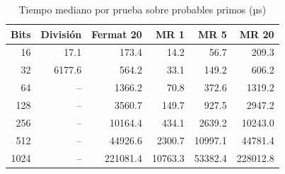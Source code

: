 \begin{table}[H]\centering\small
\caption{Tiempo mediano por prueba sobre probables primos (µs)}
\label{tab:tiempos}
\begin{tabular}{rrrrrr}\toprule
Bits & División & Fermat 20 & MR 1 & MR 5 & MR 20 \\
\midrule
16 & 17.1 & 173.4 & 14.2 & 56.7 & 209.3 \\ 
32 & 6177.6 & 564.2 & 33.1 & 149.2 & 606.2 \\ 
64 & -- & 1366.2 & 70.8 & 372.6 & 1319.2 \\ 
128 & -- & 3560.7 & 149.7 & 927.5 & 2947.2 \\ 
256 & -- & 10164.4 & 434.1 & 2639.2 & 10243.0 \\ 
512 & -- & 44926.6 & 2300.7 & 10997.1 & 44781.4 \\ 
1024 & -- & 221081.4 & 10763.3 & 53382.4 & 228012.8 \\ 
\bottomrule\end{tabular}\end{table}
